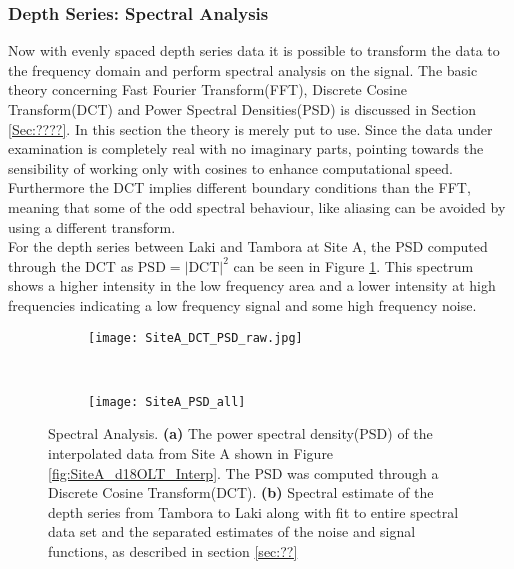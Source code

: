 \documentclass[../../CompleteThesis/Complete_1stDraft.tex]{subfiles}
\begin{document}
\subsubsection[Spectral Analysis]{Depth Series: Spectral Analysis}
Now with evenly spaced depth series data it is possible to transform the data to the frequency domain and perform spectral analysis on the signal. The basic theory concerning Fast Fourier Transform(FFT), Discrete Cosine Transform(DCT) and Power Spectral Densities(PSD) is discussed in Section \ref{Sec:????}. In this section the theory is merely put to use. Since the data under examination is completely real with no imaginary parts, pointing towards the sensibility of working only with cosines to enhance computational speed. Furthermore the DCT implies different boundary conditions than the FFT, meaning that some of the odd spectral behaviour, like aliasing can be avoided by using a different transform.\\
For the depth series between Laki and Tambora at Site A, the PSD computed through the DCT as $\text{PSD} = |\text{DCT}|^2$ can be seen in Figure \ref{fig:SiteA_DCT_PSD_raw}. This spectrum shows a higher intensity in the low frequency area and a lower intensity at high frequencies indicating a low frequency signal and some high frequency noise.
\begin{figure}[h]
	\centering
	\begin{subfigure}{.45\textwidth}
		\centering
		\texttt{[image: SiteA\_DCT\_PSD\_raw.jpg]}
		\caption[PSD of LT data, Site A]{}
		\label{fig:SiteA_DCT_PSD_raw}
	\end{subfigure}
	~
	\begin{subfigure}{0.45\textwidth}
		\texttt{[image: SiteA\_PSD\_all]}
		\caption[Spectral fit, Site A]{}%
		\label{fig:SiteA_SpectralFitsAll}
	\end{subfigure}
	\caption[Spectral Analysis]{Spectral Analysis. \textbf{(a)} The power spectral density(PSD) of the interpolated data from Site A shown in Figure \ref{fig:SiteA_d18OLT_Interp}. The PSD was computed through a Discrete Cosine Transform(DCT). \textbf{(b)} Spectral estimate of the depth series from Tambora to Laki along with fit to entire spectral data set and the separated estimates of the noise and signal functions, as described in section \ref{sec:??}}
	\label{fig:SiteA_SpectralAnalysis}
\end{figure}
\end{document}
